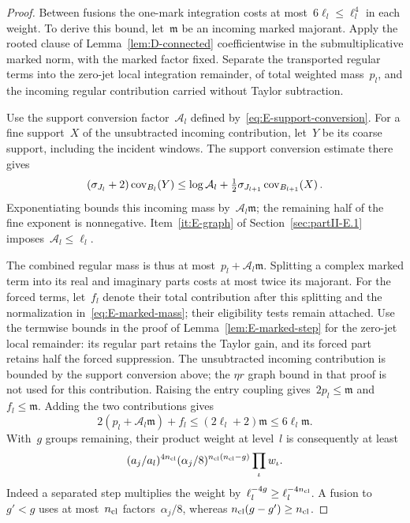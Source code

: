 \begin{proof}
Between fusions the one-mark integration costs at most~$6\ell_l\le\ell_l^4$ in each weight. To derive this bound, let~$\mathfrak m$ be an incoming marked majorant. Apply the rooted clause of Lemma~\ref{lem:D-connected} coefficientwise in the submultiplicative marked norm, with the marked factor fixed. Separate the transported regular terms into the zero-jet local integration remainder, of total weighted mass~$p_l$, and the incoming regular contribution carried without Taylor subtraction.

Use the support conversion factor~$\mathcal A_l$ defined by~\eqref{eq:E-support-conversion}. For a fine support~$X$ of the unsubtracted incoming contribution, let~$Y$ be its coarse support, including the incident windows. The support conversion estimate there gives
\begin{equation*}
(\sigma_{J_l}+2)\operatorname{cov}_{B_l}(Y)
\le\log\mathcal A_l+\tfrac12\sigma_{J_{l+1}}\operatorname{cov}_{B_{l+1}}(X)\,.
\end{equation*}
Exponentiating bounds this incoming mass by~$\mathcal A_l\mathfrak m$; the remaining half of the fine exponent is nonnegative. Item~\ref{it:E-graph} of Section~\ref{sec:partII-E.1} imposes~$\mathcal A_l\le\ell_l$.

The combined regular mass is thus at most~$p_l+\mathcal A_l\mathfrak m$. Splitting a complex marked term into its real and imaginary parts costs at most twice its majorant. For the forced terms, let~$f_l$ denote their total contribution after this splitting and the normalization in~\eqref{eq:E-marked-mass}; their eligibility tests remain attached. Use the termwise bounds in the proof of Lemma~\ref{lem:E-marked-step} for the zero-jet local remainder: its regular part retains the Taylor gain, and its forced part retains half the forced suppression. The unsubtracted incoming contribution is bounded by the support conversion above; the $\eta r$ graph bound in that proof is not used for this contribution. Raising the entry coupling gives~$2p_l\le\mathfrak m$ and~$f_l\le\mathfrak m$. Adding the two contributions gives
\begin{equation*}
2(p_l+\mathcal A_l\mathfrak m)+f_l
\le(2\ell_l+2)\mathfrak m\le6\ell_l\mathfrak m.
\end{equation*}
With~$g$ groups remaining, their product weight at level~$l$ is consequently at least
\begin{equation}\label{eq:J-marker-weights}
(a_j/a_l)^{4n_{\rm cl}}(\alpha_j/8)^{n_{\rm cl}(n_{\rm cl}-g)}\prod_\iota w_\iota.
\end{equation}
Indeed a separated step multiplies the weight by~$\ell_l^{-4g}\ge\ell_l^{-4n_{\rm cl}}$. A fusion to~$g'<g$ uses at most~$n_{\rm cl}$ factors~$\alpha_j/8$, whereas $n_{\rm cl}(g-g')\ge n_{\rm cl}$.


\end{proof}

